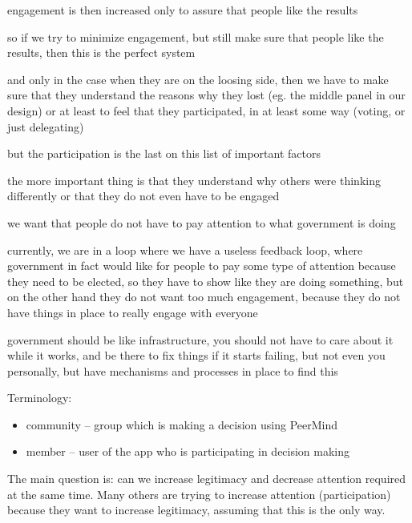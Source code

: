 \documentclass{sigchi}
\begin{document}
engagement is then increased only to assure that people like the results

so if we try to minimize engagement, but still make sure that people like the results, then this is the perfect system

and only in the case when they are on the loosing side, then we have to make sure that they understand the reasons why
they lost (eg. the middle panel in our design) or at least to feel that they participated, in at least some way
(voting, or just delegating)

but the participation is the last on this list of important factors

the more important thing is that they understand why others were thinking differently
or that they do not even have to be engaged

we want that people do not have to pay attention to what government is doing

currently, we are in a loop where we have a useless feedback loop, where government in fact would like for people
to pay some type of attention because they need to be elected, so they have to show like they are doing something,
but on the other hand they do not want too much engagement, because they do not have things in place to really
engage with everyone

government should be like infrastructure, you should not have to care about it while it works, and be there to fix
things if it starts failing, but not even you personally, but have mechanisms and processes in place to find this

Terminology:
\begin{itemize}
\item community -- group which is making a decision using PeerMind
\item member -- user of the app who is participating in decision making
\end{itemize}


The main question is: can we increase legitimacy and decrease attention required at the same time.
Many others are trying to increase attention (participation) because they want to increase legitimacy,
assuming that this is the only way.
\end{document}
